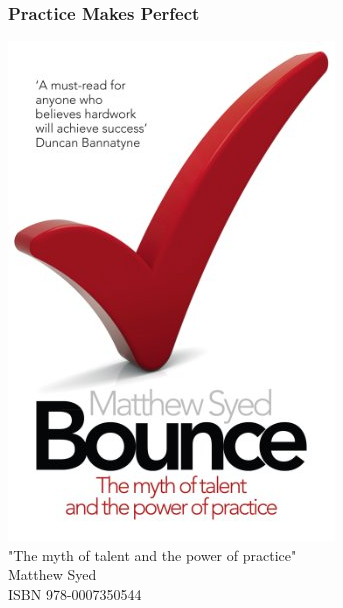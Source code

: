 \begin{frame}
    \frametitle{Practice Makes Perfect}
    \begin{center}
        \includegraphics[scale=0.2]{images/bounce}\\[2em]
        "The myth of talent and the power of practice"\\[2em]
        Matthew Syed\\
        ISBN 978-0007350544\\
    \end{center}
\end{frame}
